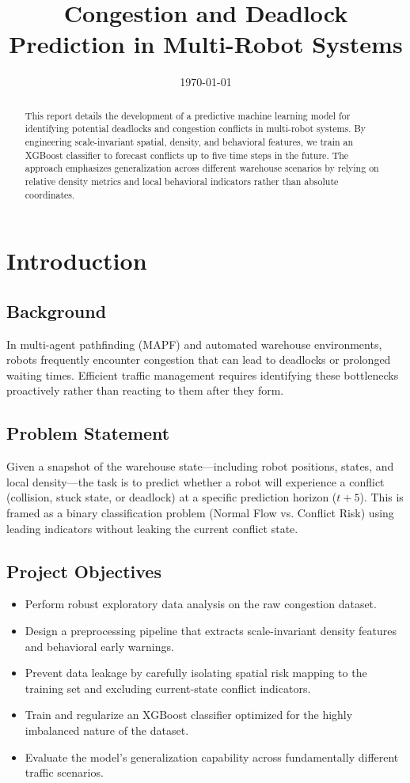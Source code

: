 \documentclass[12pt]{article}
\title{Congestion and Deadlock Prediction in Multi-Robot Systems}
\author{}
\date{\today}
\begin{document}
\maketitle
\tableofcontents
\newpage

\begin{abstract}
This report details the development of a predictive machine learning model for identifying potential deadlocks and congestion conflicts in multi-robot systems. By engineering scale-invariant spatial, density, and behavioral features, we train an XGBoost classifier to forecast conflicts up to five time steps in the future. The approach emphasizes generalization across different warehouse scenarios by relying on relative density metrics and local behavioral indicators rather than absolute coordinates.
\end{abstract}

\section{Introduction}

\subsection{Background}
In multi-agent pathfinding (MAPF) and automated warehouse environments, robots frequently encounter congestion that can lead to deadlocks or prolonged waiting times. Efficient traffic management requires identifying these bottlenecks proactively rather than reacting to them after they form.

\subsection{Problem Statement}
Given a snapshot of the warehouse state—including robot positions, states, and local density—the task is to predict whether a robot will experience a conflict (collision, stuck state, or deadlock) at a specific prediction horizon ($t+5$). This is framed as a binary classification problem (Normal Flow vs. Conflict Risk) using leading indicators without leaking the current conflict state.

\subsection{Project Objectives}
\begin{itemize}
    \item Perform robust exploratory data analysis on the raw congestion dataset.
    \item Design a preprocessing pipeline that extracts scale-invariant density features and behavioral early warnings.
    \item Prevent data leakage by carefully isolating spatial risk mapping to the training set and excluding current-state conflict indicators.
    \item Train and regularize an XGBoost classifier optimized for the highly imbalanced nature of the dataset.
    \item Evaluate the model's generalization capability across fundamentally different traffic scenarios.
\end{itemize}
\end{document}
